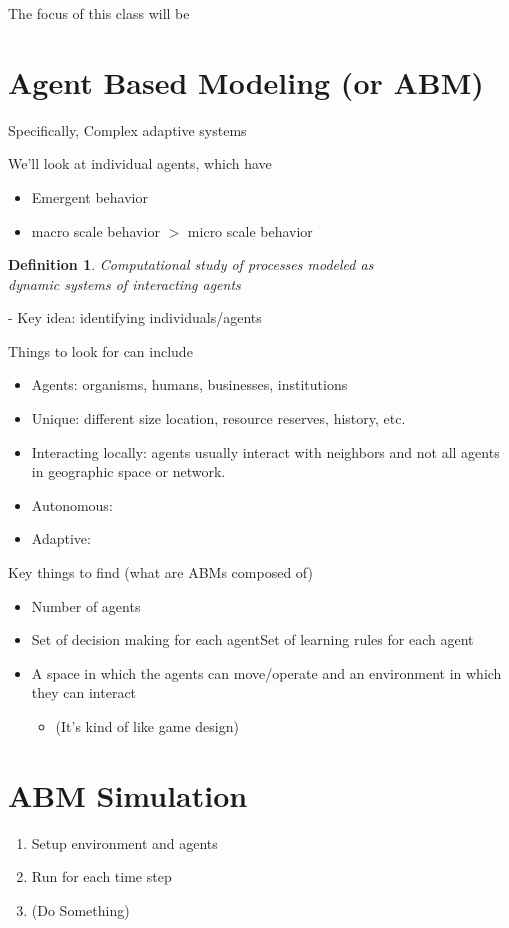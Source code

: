 \documentclass[12pt]{book}
\newtheorem*{definition*}{Definition}
\begin{document}
\vspace{50pt}
The focus of this class will be
\section{Agent Based Modeling (or ABM)}
Specifically, Complex adaptive systems

We'll look at individual agents, which have
\begin{itemize}
	\item Emergent behavior
	\item macro scale behavior $>$ micro scale behavior\\
\end{itemize}


\begin{definition*}
Computational study of processes modeled as\\ dynamic systems of interacting agents
\end{definition*}
-   Key idea: identifying individuals/agents


\newpage
\noindent Things to look for can include
\begin{itemize}
	\item Agents: organisms, humans, businesses, institutions
	\item Unique: different size location, resource reserves, history, etc.
	\item Interacting locally: agents usually interact with neighbors and not all agents in geographic space or network.
	\item Autonomous:
	\item Adaptive:
\end{itemize}

\noindent Key things to find (what are ABMs composed of)
\begin{itemize} 
	\item Number of agents
	\item Set of decision making for each agentSet of learning rules for each agent
	\item A space in which the agents can move/operate and an environment in which they can interact
	\begin{itemize} 
		\item(It's kind of like game design)
	\end{itemize}
\end{itemize}



\section{ABM Simulation}
\begin{enumerate}
	\item Setup environment and agents
	\item Run for each time step
	\item (Do Something)
\end{enumerate}
\end{document}
